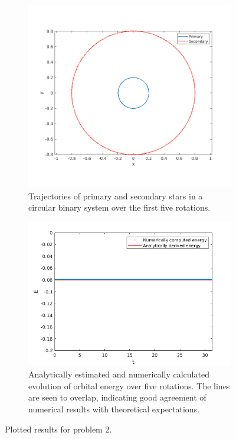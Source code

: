 \documentclass[a4paper]{article}
\begin{document}
\begin{enumerate} [label*=\textbf{(\alph*)}]
			\begin{figure} [h]
				\begin{subfigure} {.475\columnwidth}
					\includegraphics[width=\columnwidth]{../plots/2c_orbits.png}
					\caption{Trajectories of primary and secondary stars in a circular binary system over the first five rotations.}
					\label{fig:2c}
				\end{subfigure}
				\hfill
				\begin{subfigure} {.485\columnwidth}
					\includegraphics[width=\columnwidth]{../plots/2d_energies.png}
					\caption{Analytically estimated and numerically calculated evolution of orbital energy over five rotations. The lines are seen to overlap, indicating good agreement of numerical results with theoretical expectations.}
					\label{fig:2d}
				\end{subfigure}
				\caption{Plotted results for problem 2.}
				\label{fig:2}
			\end{figure}
		

\end{enumerate}
\end{document}
